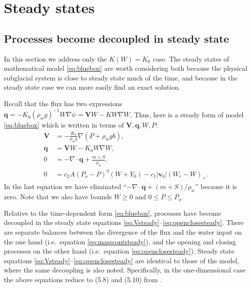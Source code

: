 \documentclass[11pt,final]{amsart}%
\newcommand\bv{\mathbf{v}}
\newcommand\bV{\mathbf{V}}
\newcommand\bq{\mathbf{q}}
\newcommand{\Div}{\nabla\cdot}
\newcommand{\grad}{\nabla}
\begin{document}
\section{Steady states}  \label{sec:steadyverif}

\subsection*{Processes become decoupled in steady state}  In this section we address only the $K(W)=K_0$ case.  The steady states of mathematical model \eqref{eq:bluebox} are worth considering both because the physical subglacial system is close to steady state much of the time, and because in the steady state case we can more easily find an exact solution.

Recall that the flux has two expressions $\bq = - K_0 (\rho_w g)^{-1} W \grad \psi = \bV W - K W \grad W$.  Thus, here is a steady form of model \eqref{eq:bluebox} which is written in terms of $\bV,\bq,W,P$:
\begin{align}
\bV &= - \frac{K_0}{\rho_w g} \grad \left(P + \rho_w g b\right), \label{eq:Vsteady} \\
\bq &= \bV W - K_0 W \grad W, \label{eq:qsteady} \\
0 &= - \Div \bq + \frac{m+S}{\rho_w}, \label{eq:masscontsteady} \\
0 &= c_2 A (P_o - P)^3 (W+Y_0) - c_1 |\bv_b| (W_r - W)_+. \label{eq:openclosesteady}
\end{align}
In the last equation we have eliminated ``$- \Div \bq + (m+S)/\rho_w$'' because it is zero.  Note that we also have bounds $W\ge 0$ and $0 \le P \le P_o$.

Relative to the time-dependent form \eqref{eq:bluebox}, processes have become decoupled in the steady state equations \eqref{eq:Vsteady}--\eqref{eq:openclosesteady}.  There are separate balances between the divergence of the flux and the water input on the one hand (i.e.~equation \eqref{eq:masscontsteady}), and the opening and closing processes on the other hand (i.e.~equation \eqref{eq:openclosesteady}).  Steady state equations \eqref{eq:Vsteady}--\eqref{eq:openclosesteady} are identical to those of the \cite{Schoofetal2012} model, where the same decoupling is also noted.  Specifically, in the one-dimensional case the above equations reduce to (5.8) and (5.10) from \cite{Schoofetal2012}.
\end{document}
